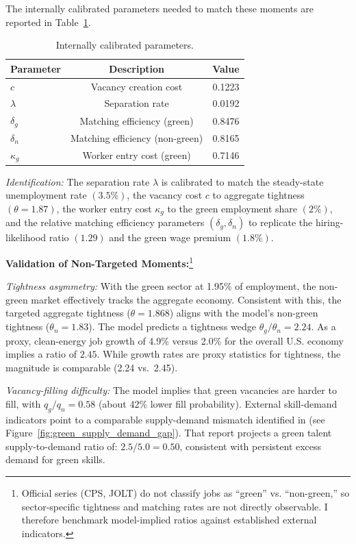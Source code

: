 \documentclass[preprint,12pt]{elsarticle}
\begin{document}
\noindent The internally calibrated parameters needed to match these moments are reported in Table~\ref{param}.  

\begin{table}[H]
\centering
\begin{tabular}{lcc}
\hline
\textbf{Parameter} & \textbf{Description} & \textbf{Value} \\
\hline
$c$        & Vacancy creation cost            & 0.1223 \\
$\lambda$  & Separation rate                  & 0.0192 \\
$\delta_g$ & Matching efficiency (green)      & 0.8476 \\
$\delta_n$ & Matching efficiency (non-green)  & 0.8165 \\
$\kappa_g$ & Worker entry cost (green)        & 0.7146 \\
\hline
\end{tabular}
\caption{Internally calibrated parameters.}
\label{param}
\end{table}

\noindent \textit{Identification:} The separation rate $\lambda$ is calibrated to match the steady-state unemployment rate $(3.5\%)$, the vacancy cost $c$ to aggregate tightness $(\theta=1.87)$, the worker entry cost $\kappa_g$ to the green employment share $(2\%)$, and the relative matching efficiency parameters $(\delta_g, \delta_n)$ to replicate the hiring-likelihood ratio $(1.29)$ and the green wage premium $(1.8\%)$. 

\medskip 

\noindent \textbf{Validation of Non-Targeted Moments:}\footnote{Official series (CPS, JOLT) do not classify jobs as “green” vs. “non-green,” so sector-specific tightness and matching rates are not directly observable. I therefore benchmark model-implied ratios against established external indicators.}

\noindent \emph{Tightness asymmetry:} With the green sector at 1.95\% of employment, the non-green market effectively tracks the aggregate economy. Consistent with this, the targeted aggregate tightness ($\theta=1.868$) aligns with the model’s non-green tightness ($\theta_n=1.83$). The model predicts a tightness wedge $\theta_g/\theta_n=2.24$. As a proxy, clean-energy job growth of 4.9\% versus 2.0\% for the overall U.S. economy \citep{DOE_USEER_2024} implies a ratio of $2.45$. While growth rates are proxy statistics for tightness, the magnitude is comparable (2.24 vs.\ 2.45).

\noindent \emph{Vacancy-filling difficulty:} The model implies that green vacancies are harder to fill, with $q_g/q_n=0.58$ (about 42\% lower fill probability). External skill-demand indicators point to a comparable supply-demand mismatch identified in \citet{linkedin2024stocktake} (see Figure~\ref{fig:green_supply_demand_gap}). That report projects a green talent supply-to-demand ratio of: $2.5/5.0 = 0.50$, consistent with persistent excess demand for green skills.
\end{document}
